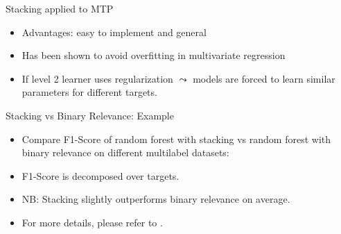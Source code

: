 \documentclass[11pt,compress,t,notes=noshow, xcolor=table]{beamer}
\begin{document}
\begin{frame}{Stacking applied to MTP }
	\begin{itemize}
		\item Advantages: easy to implement and general
        
		\item Has been shown to avoid overfitting in multivariate regression
        
		\item If level 2 learner uses regularization $\leadsto$ models are forced to learn similar parameters for different targets.  
	\end{itemize}

     {\tiny \href{https://doi.org/10.1007/978-3-642-04180-8_6}{}}
	
\end{frame}



\begin{frame}{Stacking vs Binary Relevance: Example}

   \begin{itemize}
   
       \item Compare F1-Score of random forest with stacking vs random forest with binary relevance on different multilabel datasets:
       
       \begin{center}
       \end{center}
       
       \item F1-Score is decomposed over targets.

       \item NB: Stacking slightly outperforms binary relevance on average.

       \item For more details, please refer to \href{https://journal.r-project.org/archive/2017/RJ-2017-012/RJ-2017-012.pdf}{}.
   \end{itemize}

\end{frame}


\endlecture
\end{document}
